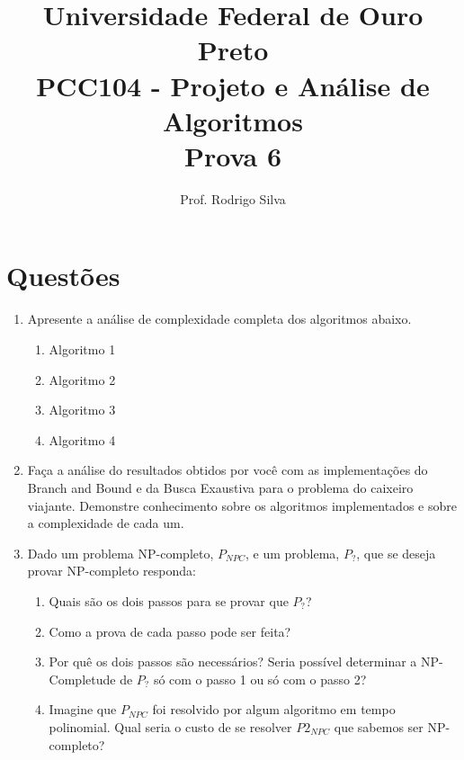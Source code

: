 \documentclass{article}
\title{\vspace{-2 cm}Universidade Federal de Ouro Preto \\ PCC104 - Projeto e Análise de Algoritmos \\ Prova 6}
\author{Prof. Rodrigo Silva}
\begin{document}
\maketitle

\section*{Questões}

\begin{enumerate}

    \item Apresente a análise de complexidade completa dos algoritmos abaixo. 
    
    \begin{enumerate}
        \item Algoritmo 1
        \begin{figure}[!ht]
            
        \end{figure}

        \item Algoritmo 2
        \begin{figure}[!ht]
            
        \end{figure}

        \item Algoritmo 3
        \begin{figure}[!ht]
            
        \end{figure}

        \item Algoritmo 4
        \begin{figure}[!ht]
            
        \end{figure}
    \end{enumerate}

    \item Faça a análise do resultados obtidos por você com as implementações do Branch and Bound e da Busca Exaustiva para o problema do caixeiro viajante. Demonstre conhecimento sobre os algoritmos implementados e sobre a complexidade de cada um.
    
    \item Dado um problema NP-completo, $P_{NPC}$, e um problema, ${P_{?}}$, que se deseja provar NP-completo responda:
    \begin{enumerate}
        \item Quais são os dois passos para se provar que $P_{?}$? 
        \item Como a prova de cada passo pode ser feita?
        \item Por quê os dois passos são necessários? Seria possível determinar a NP-Completude de $P_{?}$ só com o passo 1 ou só com o passo 2?
        \item Imagine que $P_{NPC}$ foi resolvido por algum algoritmo em tempo polinomial. Qual seria o custo de se resolver $P2_{NPC}$ que sabemos ser NP-completo? 
    \end{enumerate} 
    


    
\end{enumerate}



%
%
\end{document}
